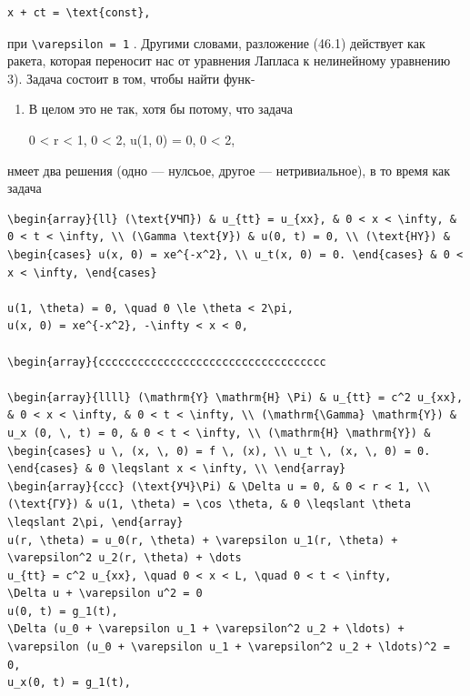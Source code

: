 \documentclass[
  ukrainian,
]{article}
\begin{document}
\begin{verbatim}
x + ct = \text{const},
\end{verbatim}

при \texttt{\textbackslash{}varepsilon\ =\ 1} . Другими словами,
разложение (46.1) действует как ракета, которая переносит нас от
уравнения Лапласа к нелинейному уравнению 3). Задача состоит в том,
чтобы найти функ-

\begin{enumerate}
\def\labelenumi{\arabic{enumi})}
\item
  В целом это не так, хотя бы потому, что задача

  0 \textless{} r \textless{} 1, 0 \le \theta \textless{} 2\pi, u(1, 0)
  = 0, 0 \le \theta \textless{} 2\pi,
\end{enumerate}

нмеет два решения (одно --- нулсьое, другое --- нетривиальное), в то
время как задача

\begin{verbatim}
\begin{array}{ll} (\text{УЧП}) & u_{tt} = u_{xx}, & 0 < x < \infty, & 0 < t < \infty, \\ (\Gamma \text{У}) & u(0, t) = 0, \\ (\text{HY}) & \begin{cases} u(x, 0) = xe^{-x^2}, \\ u_t(x, 0) = 0. \end{cases} & 0 < x < \infty, \end{cases}

u(1, \theta) = 0, \quad 0 \le \theta < 2\pi,
u(x, 0) = xe^{-x^2}, -\infty < x < 0,

\begin{array}{ccccccccccccccccccccccccccccccccccc

\begin{array}{llll} (\mathrm{Y} \mathrm{H} \Pi) & u_{tt} = c^2 u_{xx}, & 0 < x < \infty, & 0 < t < \infty, \\ (\mathrm{\Gamma} \mathrm{Y}) & u_x (0, \, t) = 0, & 0 < t < \infty, \\ (\mathrm{H} \mathrm{Y}) & \begin{cases} u \, (x, \, 0) = f \, (x), \\ u_t \, (x, \, 0) = 0. \end{cases} & 0 \leqslant x < \infty, \\ \end{array}
\begin{array}{ccc} (\text{УЧ}\Pi) & \Delta u = 0, & 0 < r < 1, \\ (\text{ГУ}) & u(1, \theta) = \cos \theta, & 0 \leqslant \theta \leqslant 2\pi, \end{array}
u(r, \theta) = u_0(r, \theta) + \varepsilon u_1(r, \theta) + \varepsilon^2 u_2(r, \theta) + \dots
u_{tt} = c^2 u_{xx}, \quad 0 < x < L, \quad 0 < t < \infty,
\Delta u + \varepsilon u^2 = 0
u(0, t) = g_1(t),
\Delta (u_0 + \varepsilon u_1 + \varepsilon^2 u_2 + \ldots) + \varepsilon (u_0 + \varepsilon u_1 + \varepsilon^2 u_2 + \ldots)^2 = 0,
u_x(0, t) = g_1(t),
\end{verbatim}
\end{document}
